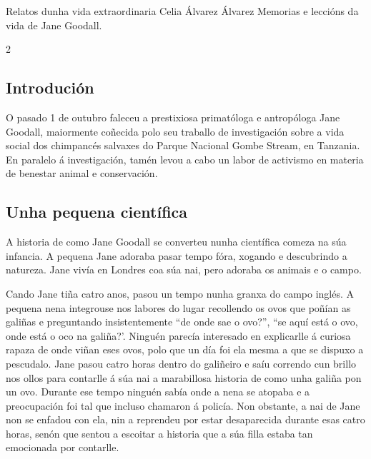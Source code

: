 \Titular*%
{historia}%
{Relatos dunha vida extraordinaria}%
{Celia Álvarez Álvarez}%
{Memorias e leccións da vida de Jane Goodall.}%

\begin{multicols}{2}

\subsection*{Introdución}

O pasado 1 de outubro faleceu a prestixiosa primatóloga e antropóloga Jane
Goodall, maiormente coñecida polo seu traballo de investigación sobre a vida
social dos chimpancés salvaxes do Parque Nacional Gombe Stream, en Tanzania. En
paralelo á investigación, tamén levou a cabo un labor de activismo en materia
de benestar animal e conservación.

\subsection*{Unha pequena científica}


A historia de como Jane Goodall se converteu nunha científica comeza na súa
infancia. A pequena Jane adoraba pasar tempo fóra, xogando e descubrindo a
natureza. Jane vivía en Londres coa súa nai, pero adoraba os animais e o campo.

Cando Jane tiña catro anos, pasou un tempo nunha granxa do campo
inglés. A pequena nena integrouse nos labores do lugar recollendo os ovos que
poñían as galiñas e preguntando insistentemente ``de onde sae o ovo?'', ``se aquí
está o ovo, onde está o oco na galiña?'. Ninguén parecía interesado en
explicarlle á curiosa rapaza de onde viñan eses ovos, polo que un día foi ela
mesma a que se dispuxo a pescudalo. Jane pasou catro horas dentro do galiñeiro
e saíu correndo cun brillo nos ollos para contarlle á súa nai a marabillosa
historia de como unha galiña pon un ovo. Durante ese tempo ninguén sabía onde
a nena se atopaba e a preocupación foi tal que incluso chamaron á policía.
Non obstante, a nai de Jane non se enfadou con ela, nin a reprendeu por estar
desaparecida durante esas catro horas, senón que sentou a escoitar a historia
que a súa filla estaba tan emocionada por contarlle.


\end{multicols}
